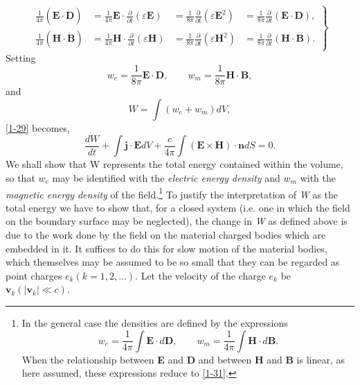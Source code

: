\documentclass[lang=en,11pt]{elegantbook}
\begin{document}
	\begin{equation}
		\left. \begin{aligned}
		\frac{1}{4\pi}(\mathbf{E\cdot\dot{D}})&=\frac{1}{4\pi}\mathbf{E}\cdot\frac{\partial}{\partial t}(\varepsilon\mathbf{E})&=\frac{1}{8\pi}\frac{\partial}{\partial t}(\varepsilon\mathbf{E}^{2})&=\frac{1}{8\pi}\frac{\partial}{\partial t}(\mathbf{E\cdot D}),\\
		\frac{1}{4\pi}(\mathbf{H\cdot\dot{B}})&=\frac{1}{4\pi}\mathbf{H}\cdot\frac{\partial}{\partial t}(\varepsilon\mathbf{H})&=\frac{1}{8\pi}\frac{\partial}{\partial t}(\varepsilon\mathbf{H}^{2})&=\frac{1}{8\pi}\frac{\partial}{\partial t}(\mathbf{H\cdot B}).	
		\end{aligned}\right\}
		\label{1-30}
	\end{equation}
	Setting
	\begin{equation}
		w_e=\frac{1}{8\pi}\mathbf{E\cdot D},\qquad w_m=\frac{1}{8\pi}\mathbf{H\cdot B},
		\label{1-31}
	\end{equation}
	and
	\begin{equation}
		W=\int(w_e+w_m)dV,
		\label{1-32}
	\end{equation}
	\eqref{1-29} becomes,
	\begin{equation}
		\frac{dW}{dt}+\int\mathbf{j\cdot E}dV+\frac{c}{4\pi}\int(\mathbf{E}\times\mathbf{H})\cdot\mathbf{n}dS=0.
		\label{1-33}
	\end{equation}
	We shall show that W represents the total energy contained within the volume, so that
	$w_e$ may be identified with the \textit{electric energy density} and $w_m$ with the \textit{magnetic energy	density} of the field.\footnote{In the general case the densities are defined by the expressions
	\begin{equation*}
		w_e=\frac{1}{4\pi}\int\mathbf{E\cdot}d\mathbf{D},\qquad w_m=\frac{1}{4\pi}\int\mathbf{H\cdot}d\mathbf{B}.
\end{equation*}
	When the relationship between \textbf{E} and \textbf{D} and between \textbf{H} and \textbf{B} is linear, as here assumed, these expressions reduce to \eqref{1-31}.}
	To justify the interpretation of \textit{W} as the total energy we have to show that, for a	closed system (i.e. one in which the field on the boundary surface may be neglected), the change in \textit{W} as defined above is due to the work done by the field on the material charged bodies which are embedded in it. It suffices to do this for slow motion of the material bodies, which themselves may be assumed to be so small that they can be regarded as point charges $e_k(k=1, 2, \dots)$. Let the velocity of the charge $e_k$ be $\mathbf{v}_k(|\mathbf{v}_k|\ll c)$.\par 
\end{document}
